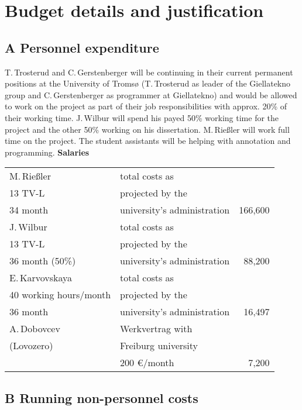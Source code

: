 \documentclass[a4paper,12pt]{article}
\begin{document}
{{{{\newpage
\section{Budget details and justification}
\subsection*{A Personnel expenditure}
T.\,Trosterud and C.\,Gersten\-berger will be continuing in their current permanent positions at the University of Tromsø (T.\,Trosterud as leader of the Giellatekno group and C.\,Gerstenberger as programmer at Giellatekno) and would be allowed to work on the project as part of their job responsibilities with approx. 20\% of their working time.%
 J.\,Wilbur will spend his payed 50\% working time for the project and the other 50\% working on his dissertation. M.\,Rießler will work full time on the project. The student assistants will be helping with annotation and programming.%
\noindent \textbf{Salaries}\\
\begin{longtable}{| l | l | r |}
\hline
M.\,Rießler&total costs as&\\
13 TV-L&projected by the&\\
34 month&university's administration&166,600\\%
\hline
J.\,Wilbur&total costs as&\\
13 TV-L&projected by the&\\
36 month (50\%)&university's administration&88,200\\
\hline
E.\,Karvovskaya&total costs as&\\
40 working hours/month& projected by the&\\
36 month&university's administration&16,497\\
\hline
A.\,Dobovcev	&Werkvertrag with	&\\
(Lovozero)	&Freiburg university	&\\
			&200 €/month		&7,200\\
\hline
\end{longtable}

\subsection*{B Running non-personnel costs}
}}}}
\end{document}
